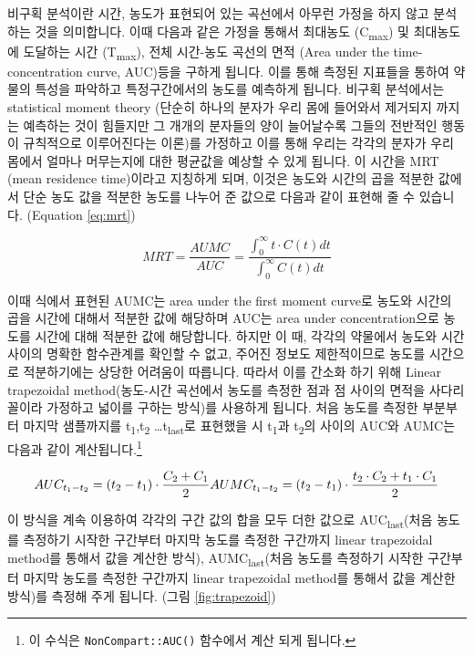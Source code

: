 \documentclass[12pt,]{krantz}
\let\rmarkdownfootnote\footnote%
\def\footnote{\protect\rmarkdownfootnote}
\begin{document}
비구획 분석이란 시간, 농도가 표현되어 있는 곡선에서 아무런 가정을 하지 않고 분석하는 것을 의미합니다.
이때 다음과 같은 가정을 통해서 최대농도 (C\textsubscript{max}) 및 최대농도에 도달하는 시간 (T\textsubscript{max}), 전체 시간-농도 곡선의 면적 (Area under the time-concentration curve, AUC)등을 구하게 됩니다.
이를 통해 측정된 지표들을 통하여 약물의 특성을 파악하고 특정구간에서의 농도를 예측하게 됩니다.
비구획 분석에서는 statistical moment theory (단순히 하나의 분자가 우리 몸에 들어와서 제거되지 까지는 예측하는 것이 힘들지만 그 개개의 분자들의 양이 늘어날수록 그들의 전반적인 행동이 규칙적으로 이루어진다는 이론)를 가정하고 이를 통해 우리는 각각의 분자가 우리 몸에서 얼마나 머무는지에 대한 평균값을 예상할 수 있게 됩니다.
이 시간을 MRT (mean residence time)이라고 지칭하게 되며, 이것은 농도와 시간의 곱을 적분한 값에서 단순 농도 값을 적분한 농도를 나누어 준 값으로 다음과 같이 표현해 줄 수 있습니다. (Equation \eqref{eq:mrt})

\[
\begin{equation}
  MRT = \frac{AUMC}{AUC} = \frac{\int_{0}^{\infty} t \cdot C(t) dt}{\int_{0}^{\infty} C(t) dt}
  \label{eq:mrt}
\end{equation}
\]

이때 식에서 표현된 AUMC는 area under the first moment curve로 농도와 시간의 곱을 시간에 대해서 적분한 값에 해당하며 AUC는 area under concentration으로 농도를 시간에 대해 적분한 값에 해당합니다.
하지만 이 때, 각각의 약물에서 농도와 시간 사이의 명확한 함수관계를 확인할 수 없고, 주어진 정보도 제한적이므로 농도를 시간으로 적분하기에는 상당한 어려움이 따릅니다.
따라서 이를 간소화 하기 위해 Linear trapezoidal method(농도-시간 곡선에서 농도를 측정한 점과 점 사이의 면적을 사다리꼴이라 가정하고 넓이를 구하는 방식)를 사용하게 됩니다.
처음 농도를 측정한 부분부터 마지막 샘플까지를 t\textsubscript{1},t\textsubscript{2} \ldots t\textsubscript{last}로 표현했을 시 t\textsubscript{1}과 t\textsubscript{2}의 사이의 AUC와 AUMC는 다음과 같이 계산됩니다.\footnote{이 수식은 \texttt{NonCompart::AUC()} 함수에서 계산 되게 됩니다.}

\[
AUC_{t_1-t_2} = 
  (t_2-t_1)\cdot \frac{C_2+C_1}{2} \\
AUMC_{t_1-t_2} = 
  (t_2-t_1)\cdot \frac{t_2 \cdot C_2 + t_1 \cdot C_1}{2}
\]

이 방식을 계속 이용하여 각각의 구간 값의 합을 모두 더한 값으로 AUC\textsubscript{last}(처음 농도를 측정하기 시작한 구간부터 마지막 농도를 측정한 구간까지 linear trapezoidal method를 통해서 값을 계산한 방식), AUMC\textsubscript{last}(처음 농도를 측정하기 시작한 구간부터 마지막 농도를 측정한 구간까지 linear trapezoidal method를 통해서 값을 계산한 방식)를 측정해 주게 됩니다. (그림 \ref{fig:trapezoid})
\end{document}
